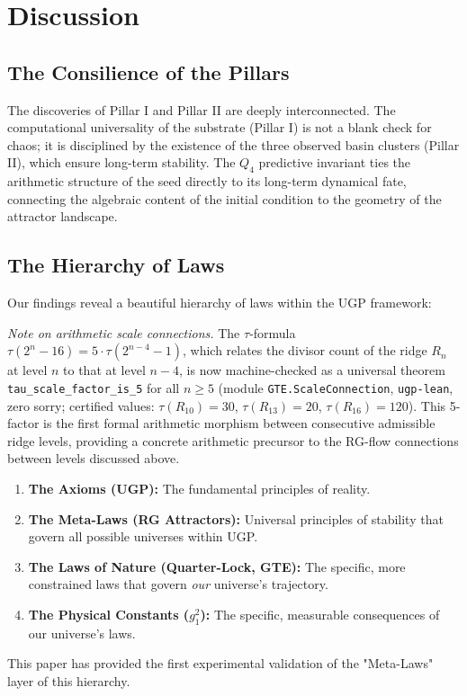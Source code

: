 \documentclass[11pt]{article}
\begin{document}
\section{Discussion}

\subsection{The Consilience of the Pillars}
The discoveries of Pillar I and Pillar II are deeply interconnected. The computational universality of the substrate (Pillar I) is not a blank check for chaos; it is disciplined by the existence of the three observed basin clusters (Pillar II), which ensure long-term stability. The $Q_4$ predictive invariant ties the arithmetic structure of the seed directly to its long-term dynamical fate, connecting the algebraic content of the initial condition to the geometry of the attractor landscape.

\subsection{The Hierarchy of Laws}
Our findings reveal a beautiful hierarchy of laws within the UGP framework:

\noindent\textit{Note on arithmetic scale connections.} The $\tau$-formula $\tau(2^n{-}16) = 5\cdot\tau(2^{n-4}{-}1)$, which relates the divisor count of the ridge $R_n$ at level $n$ to that at level $n{-}4$, is now machine-checked as a universal theorem \texttt{tau\_scale\_factor\_is\_5} for all $n\ge 5$ (module \texttt{GTE.ScaleConnection}, \texttt{ugp-lean}, zero sorry; certified values: $\tau(R_{10})=30$, $\tau(R_{13})=20$, $\tau(R_{16})=120$).  This 5-factor is the first formal arithmetic morphism between consecutive admissible ridge levels, providing a concrete arithmetic precursor to the RG-flow connections between levels discussed above.
\begin{enumerate}[leftmargin=1.2em,itemsep=0.2em]
    \item \textbf{The Axioms (UGP):} The fundamental principles of reality.
    \item \textbf{The Meta-Laws (RG Attractors):} Universal principles of stability that govern all possible universes within UGP.
    \item \textbf{The Laws of Nature (Quarter-Lock, GTE):} The specific, more constrained laws that govern \textit{our} universe's trajectory.
    \item \textbf{The Physical Constants ($g_1^2$):} The specific, measurable consequences of our universe's laws.
\end{enumerate}
This paper has provided the first experimental validation of the "Meta-Laws" layer of this hierarchy.
\end{document}

